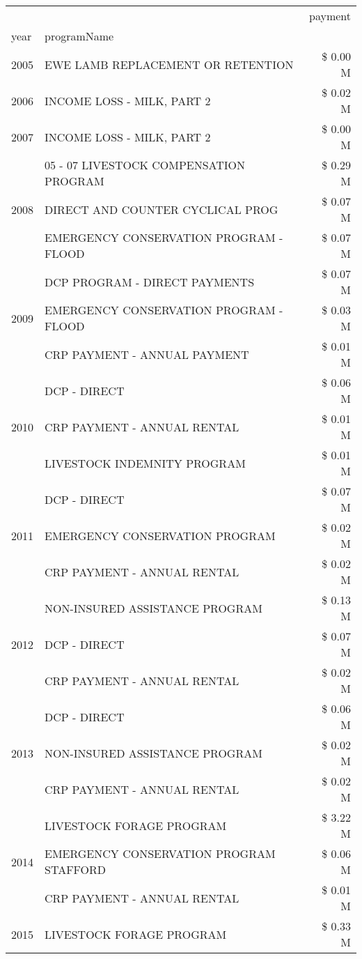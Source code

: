 \begin{tabular}{llr}
\toprule
 &  & payment \\
year & programName &  \\
\midrule
2005 & EWE LAMB REPLACEMENT OR RETENTION & \$ 0.00 M \\
\cline{1-3}
2006 & INCOME LOSS - MILK, PART 2 & \$ 0.02 M \\
\cline{1-3}
2007 & INCOME LOSS - MILK, PART 2 & \$ 0.00 M \\
\cline{1-3}
\multirow[t]{3}{*}{2008} & 05 - 07 LIVESTOCK COMPENSATION PROGRAM & \$ 0.29 M \\
 & DIRECT AND COUNTER CYCLICAL PROG & \$ 0.07 M \\
 & EMERGENCY CONSERVATION PROGRAM - FLOOD & \$ 0.07 M \\
\cline{1-3}
\multirow[t]{3}{*}{2009} & DCP PROGRAM - DIRECT PAYMENTS & \$ 0.07 M \\
 & EMERGENCY CONSERVATION PROGRAM - FLOOD & \$ 0.03 M \\
 & CRP PAYMENT - ANNUAL PAYMENT & \$ 0.01 M \\
\cline{1-3}
\multirow[t]{3}{*}{2010} & DCP - DIRECT & \$ 0.06 M \\
 & CRP PAYMENT - ANNUAL RENTAL & \$ 0.01 M \\
 & LIVESTOCK INDEMNITY PROGRAM & \$ 0.01 M \\
\cline{1-3}
\multirow[t]{3}{*}{2011} & DCP - DIRECT & \$ 0.07 M \\
 & EMERGENCY CONSERVATION PROGRAM & \$ 0.02 M \\
 & CRP PAYMENT - ANNUAL RENTAL & \$ 0.02 M \\
\cline{1-3}
\multirow[t]{3}{*}{2012} & NON-INSURED ASSISTANCE PROGRAM & \$ 0.13 M \\
 & DCP - DIRECT & \$ 0.07 M \\
 & CRP PAYMENT - ANNUAL RENTAL & \$ 0.02 M \\
\cline{1-3}
\multirow[t]{3}{*}{2013} & DCP - DIRECT & \$ 0.06 M \\
 & NON-INSURED ASSISTANCE PROGRAM & \$ 0.02 M \\
 & CRP PAYMENT - ANNUAL RENTAL & \$ 0.02 M \\
\cline{1-3}
\multirow[t]{3}{*}{2014} & LIVESTOCK FORAGE PROGRAM & \$ 3.22 M \\
 & EMERGENCY CONSERVATION PROGRAM STAFFORD & \$ 0.06 M \\
 & CRP PAYMENT - ANNUAL RENTAL & \$ 0.01 M \\
\cline{1-3}
\multirow[t]{3}{*}{2015} & LIVESTOCK FORAGE PROGRAM & \$ 0.33 M \\

\end{tabular}
